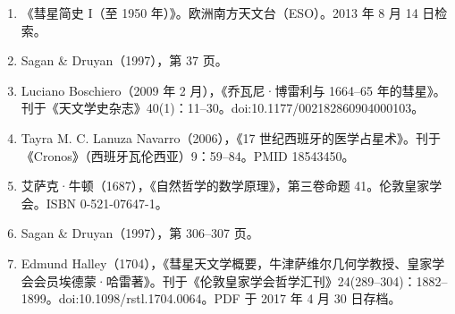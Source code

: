 \begin{enumerate}
\item 《彗星简史 I（至 1950 年）》。欧洲南方天文台（ESO）。2013 年 8 月 14 日检索。
\item Sagan & Druyan（1997），第 37 页。
\item Luciano Boschiero（2009 年 2 月），《乔瓦尼·博雷利与 1664–65 年的彗星》。刊于《天文学史杂志》40(1)：11–30。doi:10.1177/002182860904000103。
\item Tayra M. C. Lanuza Navarro（2006），《17 世纪西班牙的医学占星术》。刊于《Cronos》（西班牙瓦伦西亚）9：59–84。PMID 18543450。
\item 艾萨克·牛顿（1687），《自然哲学的数学原理》，第三卷命题 41。伦敦皇家学会。ISBN 0-521-07647-1。
\item Sagan & Druyan（1997），第 306–307 页。
\item Edmund Halley（1704），《彗星天文学概要，牛津萨维尔几何学教授、皇家学会会员埃德蒙·哈雷著》。刊于《伦敦皇家学会哲学汇刊》24(289–304)：1882–1899。doi:10.1098/rstl.1704.0064。PDF 于 2017 年 4 月 30 日存档。
\end{enumerate}
















